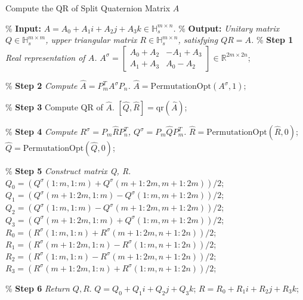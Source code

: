 \documentclass[12pt]{article}
\begin{document}
\begin{algorithm}[htbp] 
    \caption{Compute the QR of Split Quaternion Matrix \(A\)}
    \label{alg:QR}
    \begin{algorithmic}[1]
        \State \% \textbf{Input:} \textit{\(A = A_0 + A_1 i + A_2 j + A_3 k \in \mathbb{H}_s^{m\times n}\).}
        \State \% \textbf{Output:} \textit{Unitary matrix \(Q \in \mathbb{H}_s^{m\times m}\), upper triangular matrix \(R \in \mathbb{H}_s^{m\times n}\), satisfying \(Q  R = A\).}
        \State
        \State \% \textbf{Step 1} \textit{Real representation of $A$.}
        \State \(A^\sigma = \begin{bmatrix}
            A_0 + A_2 & -A_1 + A_3 \\ 
            A_1 + A_3 & A_0 - A_2
            \end{bmatrix} \in \mathbb{R}^{2m\times 2n}\); 
        
        \State
        \State \% \textbf{Step 2} \textit{Compute \(\widehat{A} = P_{m}^T A^\sigma P_{n}\).}
        \State $\widehat{A}=\text{PermutationOpt}(A^\sigma,1);$  
        
        \State
        \State \% \textbf{Step 3} Compute QR of $\widehat{A}$.
        \State \([\widehat{Q},\widehat{R}] = \text{qr}(\widehat{A})\); 
        
        \State
        \State \% \textbf{Step 4} \textit{Compute \(R^\sigma = P_{m}\widehat{R}P_{n}^T\), \(Q^\sigma = P_{m}\widehat{Q}P_{m}^T\). }
        \State $\widehat{R}=\text{PermutationOpt}(\widehat{R},0)$;
        \State $\widehat{Q}=\text{PermutationOpt}(\widehat{Q},0)$;
        
        \State
        \State \% \textbf{Step 5} \textit{Construct matrix Q, R.}
        \State $Q_0 = (Q^\sigma(1\!:\!m,1\!:\!m) + Q^\sigma(m+1\!:\!2m,m+1\!:\!2m))/2$;
        \State $Q_1 = (Q^\sigma(m+1\!:\!2m,1\!:\!m) - Q^\sigma(1\!:\!m,m+1\!:\!2m))/2$;
        \State $Q_2 = (Q^\sigma(1\!:\!m,1\!:\!m) - Q^\sigma(m+1\!:\!2m,m+1\!:\!2m))/2$;
        \State $Q_3 = (Q^\sigma(m+1\!:\!2m,1\!:\!m) + Q^\sigma(1\!:\!m,m+1\!:\!2m))/2$;
        \State $R_0 = (R^\sigma(1\!:\!m,1\!:\!n) + R^\sigma(m+1\!:\!2m,n+1\!:\!2n))/2$;
        \State $R_1 = (R^\sigma(m+1\!:\!2m,1\!:\!n) - R^\sigma(1\!:\!m,n+1\!:\!2n))/2$;
        \State $R_2 = (R^\sigma(1\!:\!m,1\!:\!n) - R^\sigma(m+1\!:\!2m,n+1\!:\!2n))/2$;
        \State $R_3 = (R^\sigma(m+1\!:\!2m,1\!:\!n) + R^\sigma(1\!:\!m,n+1\!:\!2n))/2$;

        \State
        \State \% \textbf{Step 6} \textit{Return $Q, R$}.
        \State $Q = Q_0 + Q_1i + Q_2j + Q_3k$; 
        \State $R = R_0 + R_1i + R_2j + R_3k$;
    \End 
    \end{algorithmic}
\end{algorithm}
\end{document}
